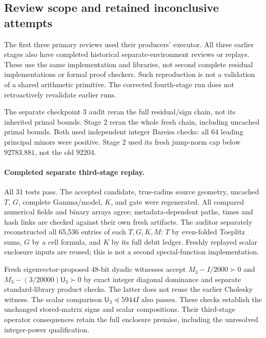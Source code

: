 \documentclass[11pt,a4paper]{article}
\numberwithin{equation}{section}
\theoremstyle{definition}\newtheorem{definition}[theorem]{Definition}
\theoremstyle{remark}\newtheorem{remark}[theorem]{Remark}
\begin{document}
\subsection{Review scope and retained inconclusive attempts}\label{vrg:sec:review}
The first three primary reviews used their producers' executor.
All three earlier stages also have completed historical separate-environment
reviews or replays. These use the same implementation and libraries, not
second complete residual implementations or formal proof checkers. Such
reproduction is not a validation of a shared arithmetic primitive. The
corrected fourth-stage run does not retroactively revalidate earlier runs.

The separate checkpoint 3 audit reran the full residual/sign chain, not
its inherited primal bounds. Stage 2 reran the whole fresh chain, including
uncached primal bounds. Both used independent integer Bareiss checks:
all 64 leading principal minors were positive. Stage 2 used its fresh
jump-norm cap below \(92783.881\), not the old \(92204\).

\paragraph{Completed separate third-stage replay.}
All 31 tests pass. The accepted candidate, true-radius source geometry,
uncached \(T\), \(G\), complete Gamma/model, \(K\), and gate were regenerated.
All compared numerical fields and binary arrays agree; metadata-dependent
paths, times and hash links are checked against their own fresh artifacts.
The auditor separately reconstructed all 65,536 entries of each \(T,G,K,M\):
\(T\) by even-folded Toeplitz sums, \(G\) by a cell formula, and \(K\) by its
full debit ledger. Freshly replayed scalar enclosure inputs are reused;
this is not a second special-function implementation.

Fresh eigenvector-proposed 48-bit dyadic witnesses accept
\(M_3-I/2000\succ0\) and \(M_3-(3/20000)\mathsf U_3\succ0\) by exact
integer diagonal dominance and separate standard-library product checks.
The latter does not reuse the earlier Cholesky witness.
The scalar comparison \(\mathsf U_3\preceq5944I\) also passes.
These checks establish the unchanged stored-matrix signs and scalar
compositions. Their third-stage operator consequences retain the full
enclosure premise, including the unresolved integer-power qualification.
\end{document}
